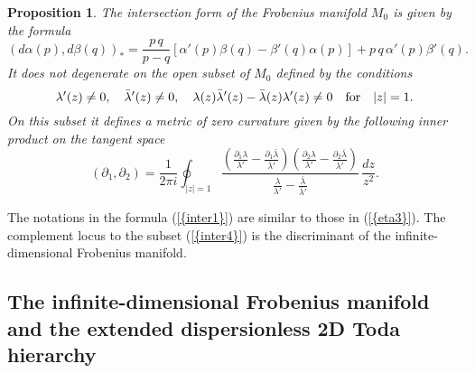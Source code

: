 \documentclass[numbook, envcountsame, envcountreset]{svjour3}
\newtheorem{prop}[theorem]{Proposition}
\begin{document}
\begin{prop}\label{prop2} The intersection form of the Frobenius manifold $M_0$ is given by the formula
\begin{equation}\label{inter1}
\left(d\alpha(p), d\beta(q)\right)_* = \frac{p\, q}{p-q} \left[ \alpha'(p)\beta(q) -\beta'(q)\alpha(p)\right] +p\, q\, \alpha'(p) \beta'(q).
\end{equation}
It does not degenerate on the open subset of $M_0$ defined by the conditions
\begin{equation}\label{inter4}
\lambda'(z)\neq0, \quad \bar\lambda'(z)\neq 0, \quad \lambda(z)\bar\lambda'(z)-\bar\lambda(z) \lambda'(z)\neq 0 \quad {\rm for}\quad |z|=1.
\end{equation}
On this subset it defines a metric of zero curvature given by the following inner product on the tangent space
\begin{equation}\label{inter5}
({\partial}_1, {\partial}_2) =\frac1{2\pi i} \oint_{|z|=1} \frac{\left( \frac{{\partial}_1\lambda}{\lambda'} - \frac{{\partial}_1\bar\lambda}{\bar\lambda'}\right)\left( \frac{{\partial}_2\lambda}{\lambda'} - \frac{{\partial}_2\bar\lambda}{\bar\lambda'}\right)}{\frac{\lambda}{\lambda'} -\frac{\bar\lambda}{\bar\lambda'}}\, \frac{dz}{z^2}.
\end{equation}
\end{prop}

The notations in the formula {(\ref{{inter1}})} are similar to those in {(\ref{{eta3}})}. The complement  locus to the subset {(\ref{{inter4}})} is the discriminant of the infinite-dimensional Frobenius manifold.

\subsection{\bf The infinite-dimensional Frobenius manifold and the extended dispersionless 2D Toda hierarchy}\par
\end{document}
